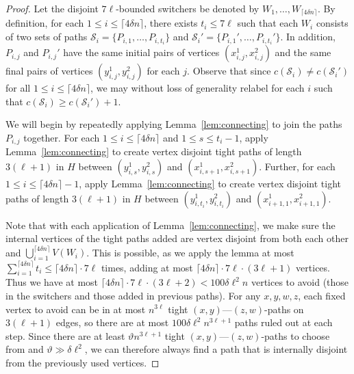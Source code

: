\documentclass[A4paper,12pt]{article}
\theoremstyle{definition}
\begin{document}
\begin{proof}[Proof]
     Let the disjoint $7\ell$-bounded switchers be denoted by $W_1, \ldots, W_{\lceil 4 \delta n \rceil}$.
     By definition, for each $1 \le i \le \lceil 4 \delta n \rceil$, 
     there exists $t_i \leq 7\ell$ such that each $W_i$ consists of two sets of paths $\mathcal{S}_i = \{P_{i,1}, \ldots, P_{i,t_i}\}$ and $\mathcal{S}_i' = \{P_{i,1}', \ldots, P_{i,t_i}'\}$. In addition, $P_{i,j}$ and $P_{i,j}'$ have the same initial pairs of vertices $(x^1_{i,j}, x^2_{i,j})$ and the same final pairs of vertices $(y^1_{i,j}, y^2_{i,j})$ for each $j$. 
    Observe that since $c(\mathcal{S}_i) \neq c(\mathcal{S}_i')$ for all  $1 \le i  \le \lceil 4 \delta n \rceil$, 
     we may without loss of generality relabel for each $i$ such that $c(\mathcal{S}_i) \geq c(\mathcal{S}_i') + 1$. 

     We will begin by repeatedly applying Lemma~\ref{lem:connecting} to join the paths $P_{i,j}$ together. 
     For each $1 \le i \le \lceil 4 \delta n \rceil$ and  $1 \le s \le t_i-1$, apply Lemma~\ref{lem:connecting} to create vertex disjoint tight paths of length $3(\ell + 1)$ in $H$ between $(y^1_{i,s}, y^2_{i,s})$ and $(x^1_{i,s+1}, x^2_{i,s+1})$.
     Further, for each $1 \le i \le \lceil 4 \delta n \rceil - 1$, apply Lemma~\ref{lem:connecting} to create vertex disjoint tight paths of length $3(\ell + 1)$ in $H$ between $(y^1_{i,t_i}, y^2_{i,t_i})$ and $(x^1_{i+1,1}, x^2_{i+1,1})$.
     
     Note that with each application of Lemma~\ref{lem:connecting}, we make sure the internal vertices of the tight paths added are vertex disjoint from both each other and $\bigcup_{i =1}^{\lceil4\delta n\rceil} V(W_i)$.  This is possible, as we apply the lemma
     at most $\sum_{i=1}^{\lceil 4 \delta n \rceil} t_i \le \lceil 4 \delta n \rceil \cdot 7\ell$ times, adding at most $\lceil 4 \delta n \rceil  \cdot 7\ell \cdot (3\ell +1)$ vertices. Thus we have at most $\lceil 4 \delta n \rceil  \cdot 7\ell \cdot (3\ell +2) < 100\delta \ell^2 n$ vertices to avoid (those in the switchers and those added in previous paths). For any $x,y,w,z$, each fixed vertex to avoid can be in at most $n^{3\ell}$ tight $(x,y)$---$(z,w)$-paths on $3(\ell+1)$ edges, so there are at most $100\delta \ell^2 n^{3\ell+1}$ paths ruled out at each step. Since there are at least $\vartheta n^{3\ell+1}$ tight $(x,y)$---$(z,w)$-paths to choose from and $\vartheta \gg \delta \ell^2$, we can therefore always find a path that is internally disjoint from the previously used vertices.
          

\end{proof}
\end{document}
